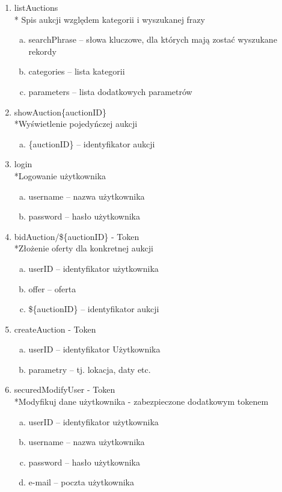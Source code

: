 \documentclass[10pt,titlepage]{article} %
\begin{document}
\begin{enumerate}[1.]
\item listAuctions
\\* Spis aukcji względem kategorii i wyszukanej frazy
\begin{enumerate}[a.]
\item searchPhrase – słowa kluczowe, dla których mają zostać wyszukane rekordy
\item categories – lista kategorii
\item parameters – lista dodatkowych parametrów
\end{enumerate}

\item showAuction\/\{auctionID\}
\\*Wyświetlenie pojedyńczej aukcji
\begin{enumerate}[a.]
\item \{auctionID\} – identyfikator aukcji
\end{enumerate}

\item login 
\\*Logowanie użytkownika
\begin{enumerate}[a.]
\item username – nazwa użytkownika
\item password – hasło użytkownika
\end{enumerate}

\item bidAuction/\$\{auctionID\} - Token
\\*Złożenie oferty dla konkretnej aukcji
\begin{enumerate}[a.]
\item userID – identyfikator użytkownika
\item offer – oferta
\item \$\{auctionID\} – identyfikator aukcji
\end{enumerate}

\item createAuction - Token
\begin{enumerate}[a.]
\item userID – identyfikator Użytkownika
\item parametry – tj. lokacja, daty etc.
\end{enumerate}

\item securedModifyUser - Token
\\*Modyfikuj dane użytkownika - zabezpieczone dodatkowym tokenem
\begin{enumerate}[a.]
\item userID – identyfikator użytkownika
\item username – nazwa użytkownika
\item password – hasło użytkownika
\item e-mail – poczta użytkownika
\end{enumerate}


\end{enumerate}
\end{document}
